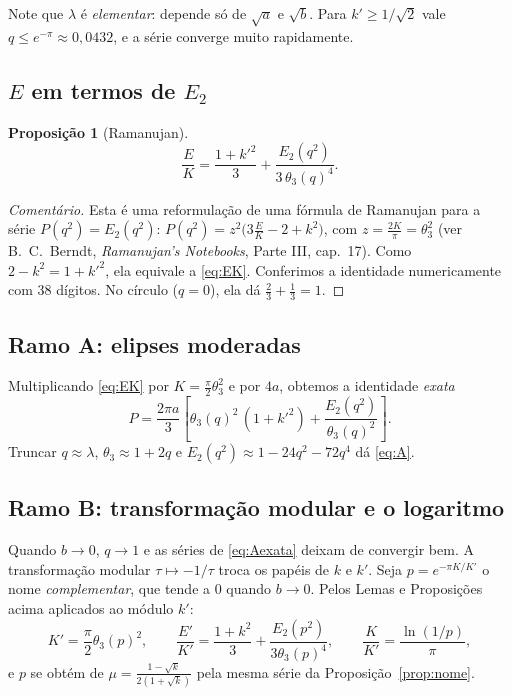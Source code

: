 \documentclass[11pt,a4paper]{article}
\newtheorem{proposicao}[teorema]{Proposição}
\theoremstyle{remark}
\begin{document}
Note que $\lambda$ é \emph{elementar}: depende só de $\sqrt a$ e $\sqrt b$.
Para $k'\ge1/\sqrt2$ vale $q\le e^{-\pi}\approx0{,}0432$, e a série converge muito
rapidamente.

\subsection{\texorpdfstring{$E$}{E} em termos de \texorpdfstring{$E_2$}{E2}}

\begin{proposicao}[Ramanujan]\label{prop:E2}
\begin{equation}\label{eq:EK}
\frac EK=\frac{1+k'^2}{3}+\frac{E_2(q^2)}{3\,\theta_3(q)^4}.
\end{equation}
\end{proposicao}
\begin{proof}[Comentário]
Esta é uma reformulação de uma fórmula de Ramanujan para a série $P(q^2)=E_2(q^2)$:
$P(q^2)=z^2\big(3\tfrac EK-2+k^2\big)$, com $z=\tfrac{2K}{\pi}=\theta_3^2$ (ver
B.~C.~Berndt, \emph{Ramanujan's Notebooks}, Parte III, cap.~17). Como
$2-k^2=1+k'^2$, ela equivale a \eqref{eq:EK}. Conferimos a identidade numericamente com
38 dígitos. No círculo ($q=0$), ela dá $\frac23+\frac13=1$.
\end{proof}

\subsection{Ramo A: elipses moderadas}

Multiplicando \eqref{eq:EK} por $K=\frac\pi2\theta_3^2$ e por $4a$, obtemos a identidade
\emph{exata}
\begin{equation}\label{eq:Aexata}
P=\frac{2\pi a}{3}\left[\theta_3(q)^2\,(1+k'^2)+\frac{E_2(q^2)}{\theta_3(q)^2}\right].
\end{equation}
Truncar $q\approx\lambda$, $\theta_3\approx1+2q$ e $E_2(q^2)\approx1-24q^2-72q^4$ dá \eqref{eq:A}.

\subsection{Ramo B: transformação modular e o logaritmo}

Quando $b\to0$, $q\to1$ e as séries de \eqref{eq:Aexata} deixam de convergir bem. A
transformação modular $\tau\mapsto-1/\tau$ troca os papéis de $k$ e $k'$. Seja
$p=e^{-\pi K/K'}$ o nome \emph{complementar}, que tende a $0$ quando $b\to0$. Pelos
Lemas e Proposições acima aplicados ao módulo $k'$:
\[
K'=\frac\pi2\theta_3(p)^2,\qquad
\frac{E'}{K'}=\frac{1+k^2}{3}+\frac{E_2(p^2)}{3\theta_3(p)^4},\qquad
\frac{K}{K'}=\frac{\ln(1/p)}{\pi},
\]
e $p$ se obtém de $\mu=\frac{1-\sqrt k}{2(1+\sqrt k)}$ pela mesma série da
Proposição~\ref{prop:nome}.
\end{document}
